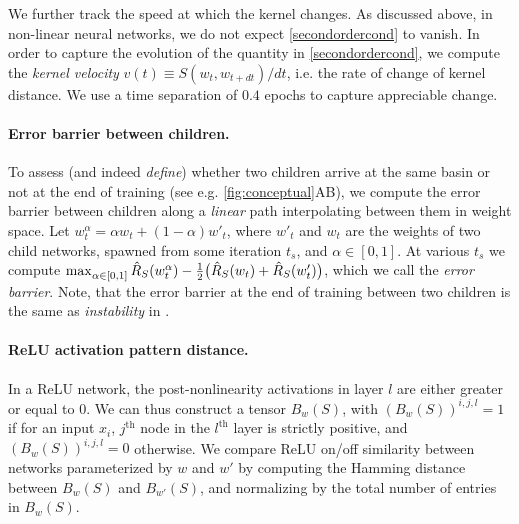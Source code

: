 \documentclass{article}
\begin{document}
We further track the speed at which the kernel changes. As discussed above, in non-linear neural networks, we do not expect  \cref{secondordercond} to vanish. In order to capture the evolution of the quantity in \cref{secondordercond}, we compute the \emph{kernel velocity} $v(t) \equiv S(w_t,w_{t+dt})  / dt$, i.e. the rate of change of kernel distance. We use a time separation of $0.4$ epochs to capture appreciable change.  


%
%

%
%

\vspace{-0.3cm}
\paragraph{Error barrier between children.}
To assess (and indeed \emph{define}) whether two children arrive at the same basin or not at the end of training (see e.g. \cref{fig:conceptual}AB), we compute the error barrier between children along a \emph{linear} path interpolating between them in weight space. 
Let $w^{\alpha} _t =  \alpha w_t + (1-\alpha) w'_t$, where $w'_t$ and $w_t$ are the weights of two child networks, spawned from some iteration $t_s$, and $\alpha \in [0,1]$.
At various $t_s$ we compute $\max_{ \alpha \in [0,1] } \EmpRisk{S}{w^{\alpha} _t } - \frac1 2 {\big(\EmpRisk{S}{w_t} + \EmpRisk{S}{w'_t}\big)}$, 
which we call the \emph{error barrier}. 
Note, that the error barrier at the end of training between two children is the same as \emph{instability} in \citep{frankle2019linear}.

%

%

\vspace{-0.3cm}
\paragraph{ReLU activation pattern distance.}
In a ReLU network, the post-nonlinearity activations in layer $l$ are either greater or equal to $0$.
%
%
%
We can thus construct a tensor $B_w(S)$, with $(B_w(S))^{i,j,l} = 1$ if for an input $x_i$, $j^\mathrm{th}$ node in the $l^\mathrm{th}$ layer is strictly positive, and $(B_w(S))^{i,j,l} = 0$ otherwise. We compare ReLU on/off similarity between networks parameterized by $w$ and $w'$ by computing the Hamming distance between $B_w(S)$ and $B_{w'}(S)$, and normalizing by the total number of entries in $B_w(S)$.
%
\end{document}
